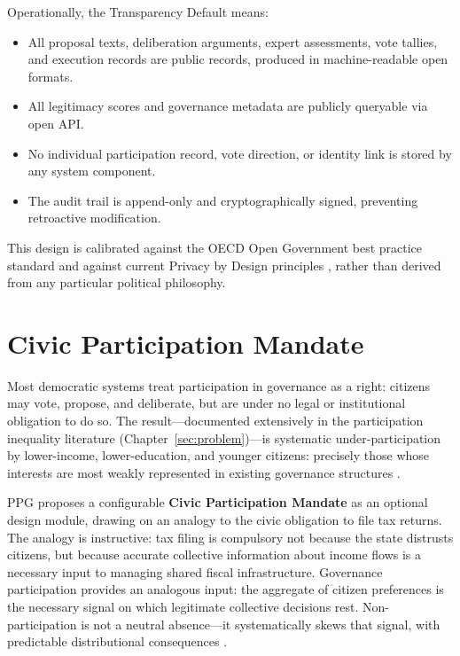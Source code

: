 \documentclass[12pt,a4paper,oneside]{report}
\begin{document}
Operationally, the Transparency Default means:

\begin{itemize}
  \item All proposal texts, deliberation arguments, expert assessments, vote tallies, and execution records are public records, produced in machine-readable open formats.
  \item All legitimacy scores and governance metadata are publicly queryable via open API.
  \item No individual participation record, vote direction, or identity link is stored by any system component.
  \item The audit trail is append-only and cryptographically signed, preventing retroactive modification.
\end{itemize}

This design is calibrated against the OECD Open Government best practice standard \citep{oecd2020open} and against current Privacy by Design principles \citep{boneh2020graduate}, rather than derived from any particular political philosophy.

\section{Civic Participation Mandate}
\label{sec:mandate}

Most democratic systems treat participation in governance as a right: citizens may vote, propose, and deliberate, but are under no legal or institutional obligation to do so. The result---documented extensively in the participation inequality literature (Chapter~\ref{sec:problem})---is systematic under-participation by lower-income, lower-education, and younger citizens: precisely those whose interests are most weakly represented in existing governance structures \citep{lijphart1997unequal, schlozman2012unheavenly}.

PPG proposes a configurable \textbf{Civic Participation Mandate} as an optional design module, drawing on an analogy to the civic obligation to file tax returns. The analogy is instructive: tax filing is compulsory not because the state distrusts citizens, but because accurate collective information about income flows is a necessary input to managing shared fiscal infrastructure. Governance participation provides an analogous input: the aggregate of citizen preferences is the necessary signal on which legitimate collective decisions rest. Non-participation is not a neutral absence---it systematically skews that signal, with predictable distributional consequences \citep{lijphart1997unequal}.
\end{document}

